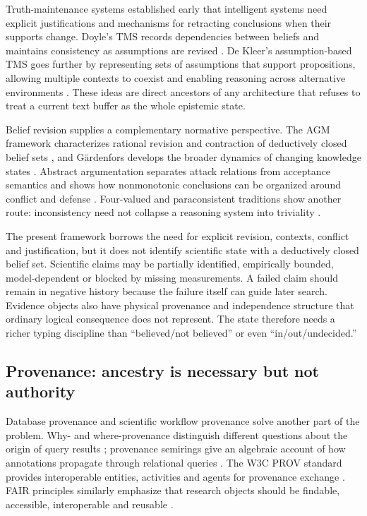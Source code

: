 \documentclass[11pt]{article}
\begin{document}
Truth-maintenance systems established early that intelligent systems need explicit justifications and mechanisms for retracting conclusions when their supports change. Doyle's TMS records dependencies between beliefs and maintains consistency as assumptions are revised \cite{doyle1979}. De Kleer's assumption-based TMS goes further by representing sets of assumptions that support propositions, allowing multiple contexts to coexist and enabling reasoning across alternative environments \cite{dekleer1986}. These ideas are direct ancestors of any architecture that refuses to treat a current text buffer as the whole epistemic state.

Belief revision supplies a complementary normative perspective. The AGM framework characterizes rational revision and contraction of deductively closed belief sets \cite{agm1985}, and G\"ardenfors develops the broader dynamics of changing knowledge states \cite{gardenfors1988}. Abstract argumentation separates attack relations from acceptance semantics and shows how nonmonotonic conclusions can be organized around conflict and defense \cite{dung1995}. Four-valued and paraconsistent traditions show another route: inconsistency need not collapse a reasoning system into triviality \cite{belnap1977}.

The present framework borrows the need for explicit revision, contexts, conflict and justification, but it does not identify scientific state with a deductively closed belief set. Scientific claims may be partially identified, empirically bounded, model-dependent or blocked by missing measurements. A failed claim should remain in negative history because the failure itself can guide later search. Evidence objects also have physical provenance and independence structure that ordinary logical consequence does not represent. The state therefore needs a richer typing discipline than ``believed/not believed'' or even ``in/out/undecided.''

\subsection{Provenance: ancestry is necessary but not authority}

Database provenance and scientific workflow provenance solve another part of the problem. Why- and where-provenance distinguish different questions about the origin of query results \cite{buneman2001}; provenance semirings give an algebraic account of how annotations propagate through relational queries \cite{green2007}. The W3C PROV standard provides interoperable entities, activities and agents for provenance exchange \cite{prov2013}. FAIR principles similarly emphasize that research objects should be findable, accessible, interoperable and reusable \cite{wilkinson2016}.
\end{document}

